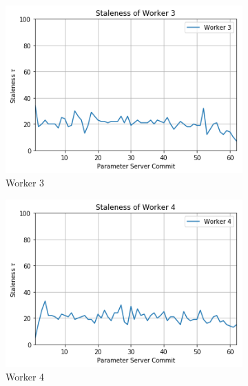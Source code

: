 \begin{figure}
\begin{subfigure}{.24\textwidth}
    \includegraphics[width=\linewidth]{resources/images/plots/adag_agn_mnist/epoch_40/15/001/staleness/worker_3}
    \caption{Worker 3}
  \end{subfigure}
  \begin{subfigure}{.24\textwidth}
    \centering
    \includegraphics[width=\linewidth]{resources/images/plots/adag_agn_mnist/epoch_40/15/001/staleness/worker_4}
    \caption{Worker 4}
  \end{subfigure}
  \begin{subfigure}{.24\textwidth}
    \centering

\end{subfigure}
\end{figure}

